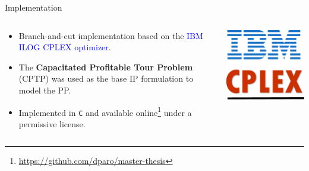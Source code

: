 \begin{frame}{Implementation}
	\begin{columns}
		\begin{column}{0.85\textwidth}
			\begin{itemize}
				\item Branch-and-cut implementation based on the \textcolor{blue}{IBM ILOG CPLEX optimizer}.
				\item The \textbf{Capacitated Profitable Tour Problem} (CPTP) \parencite{jepsen2014} was used as the base IP formulation to model the PP.
				\item Implemented in \texttt{C} and available online\footnote[1]{\url{https://github.com/dparo/master-thesis}} under a permissive license.

			\end{itemize}
		\end{column}
		\begin{column}{0.15\textwidth}
			\centering
			\includegraphics[width=\textwidth]{./Imgs/IBM-ILOG-CPLEX-logo.png}
		\end{column}
	\end{columns}

	\vspace{0.5cm}


\end{frame}
